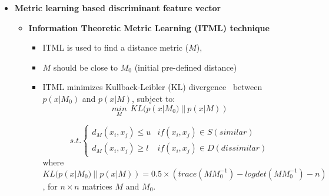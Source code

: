 \begin{frame}[t]{\subsecname}
	\topline
    \begin{itemize}
    	\item \textcolor{navy_theme}{\textbf{Metric learning based discriminant feature vector}}
    	\vspace{0.5em}
    	\begin{itemize}
    	    \item \textbf{Information Theoretic Metric Learning (ITML) technique~\cite{davis2007information}}
    	    \vspace{0.5em}
    	    \begin{itemize}
    	        \setlength\itemsep{0.5em}
    	        \item ITML is used to find a distance metric ($M$),
    	        \item $M$ should be close to $M_{0}$ (initial pre-defined distance)
    	        \item ITML minimizes Kullback-Leibler (KL) divergence~\cite{shlens2014notes}
                    between $p(x|M_{0})$ and $p(x|M)$, subject to:
                    \begin{equation}
                    	\underset{M}{min}~~KL(p(x|M_{0})~||~p(x|M))
                    \end{equation}
                    
                    \begin{equation}
                    	s.t. \left\{
                    	\begin{matrix}
                    		d_{M}(x_{i},x_{j}) \leq u & if (x_{i},x_{j}) \in S(similar)    \\
                    		d_{M}(x_{i},x_{j}) \geq l & if (x_{i},x_{j}) \in D(dissimilar)
                    	\end{matrix}\right.
                    \end{equation}
                    where $KL(p(x|M_{0})~||~ p(x|M))= 0.5 \times (trace (MM_{0}^{-1}) - logdet
                    	(MM_{0}^{-1})-n) $, for $n \times n$ matrices $M$  and $M_{0}$.
    	    \end{itemize}
            
        \end{itemize}
	\end{itemize}
\end{frame}


